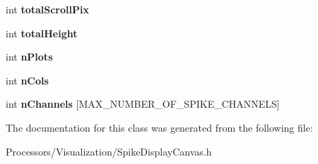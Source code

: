 \begin{DoxyCompactItemize}
\item 
\hypertarget{classSpikeDisplayCanvas_a7fbf5bfa1497755043ee6997632f4776}{int {\bfseries total\-Scroll\-Pix}}\label{classSpikeDisplayCanvas_a7fbf5bfa1497755043ee6997632f4776}

\item 
\hypertarget{classSpikeDisplayCanvas_abbeb35590db18f64175123da19f97ae9}{int {\bfseries total\-Height}}\label{classSpikeDisplayCanvas_abbeb35590db18f64175123da19f97ae9}

\item 
\hypertarget{classSpikeDisplayCanvas_ab3dee376c29dd4584cc5d1da0d686c3d}{int {\bfseries n\-Plots}}\label{classSpikeDisplayCanvas_ab3dee376c29dd4584cc5d1da0d686c3d}

\item 
\hypertarget{classSpikeDisplayCanvas_a204006bb39d3652456b107933789f631}{int {\bfseries n\-Cols}}\label{classSpikeDisplayCanvas_a204006bb39d3652456b107933789f631}

\item 
\hypertarget{classSpikeDisplayCanvas_abd88b6b00329bdd4eda812ce66e9e73c}{int {\bfseries n\-Channels} \mbox{[}M\-A\-X\-\_\-\-N\-U\-M\-B\-E\-R\-\_\-\-O\-F\-\_\-\-S\-P\-I\-K\-E\-\_\-\-C\-H\-A\-N\-N\-E\-L\-S\mbox{]}}\label{classSpikeDisplayCanvas_abd88b6b00329bdd4eda812ce66e9e73c}

\end{DoxyCompactItemize}


The documentation for this class was generated from the following file\-:\begin{DoxyCompactItemize}
\item 
Processors/\-Visualization/Spike\-Display\-Canvas.\-h\end{DoxyCompactItemize}
